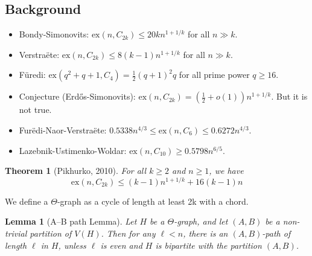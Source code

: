 \documentclass[12pt]{article}
\newtheorem{lemma}{Lemma}
\newtheorem{theorem}{Theorem}
\newcommand{\ex}{\mathrm{ex}}
\begin{document}
\subsection{Background}
\begin{itemize}
	\item Bondy-Simonovits: $\ex(n,C_{2k})\le 20kn^{1+1/k}$ for all $n\gg k.$
	\item Verstra\"ete: $\ex(n,C_{2k})\le 8(k-1)n^{1+1/k}$  for all $n\gg k.$
	\item F\"uredi: $\ex(q^2+q+1,C_4)=\frac{1}{2}(q+1)^2q$ for all prime power $q\ge 16.$
	\item Conjecture (Erd\H{o}s-Simonovits):  $\ex(n,C_{2k})=(\frac{1}{2}+o(1))n^{1+1/k}$. But it is not true.
	\item Fur\"edi-Naor-Verstra\"ete: $0.5338n^{4/3}\le\ex(n,C_6)\le0.6272n^{4/3}.$
	\item Lazebnik-Ustimenko-Woldar: $\ex(n,C_{10})\ge 0.5798n^{6/5}.$
\end{itemize}

\begin{theorem}[Pikhurko, 2010]\label{thm2k}
	For all $ k \geq 2 $ and $ n \geq 1 $, we have
	\[
	\mathrm{ex}(n, C_{2k}) \leq (k - 1) n^{1+1/k} + 16(k - 1)n
	\]
\end{theorem}

We define a $\Theta$-graph as a cycle of length at least 2k with a chord.

\begin{lemma}[A--B path Lemma]\label{abpath}
	Let $H$ be a $\Theta$-graph, and let $(A,B)$ be a non-trivial partition of $V(H)$. Then for any $\ell<n$, there is an $(A,B)$-path of length $\ell$ in $H$, unless $\ell$ is even and $H$ is bipartite with the partition $(A,B)$.
\end{lemma}
\end{document}
